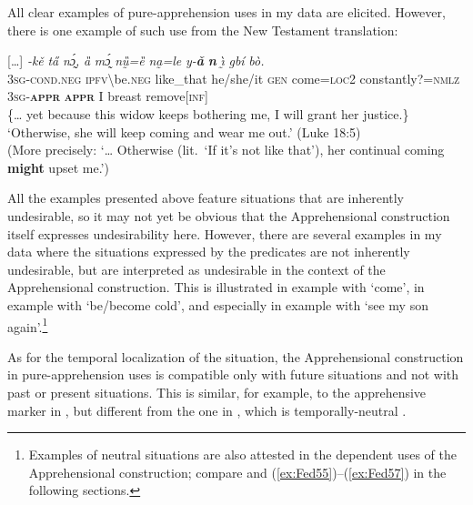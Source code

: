 \documentclass[output=paper,colorlinks,citecolor=brown]{langscibook}
\begin{document}
 All clear examples of pure-apprehension uses in my data are elicited. However, there is one example of such use from the New Testament translation:

\ea \label{ex:Fed15}
\gll \textup{[}{\ldots}\textup{]} \textit{{\E}-kě} \textit{ta̋} \textit{nɔ̰́,} \textit{ȁ} \textit{mɔ̰́} \textit{nṵ̏=ȅ} \textit{n{\ù}a̰=le} \textit{y-\textbf{ǎ}} \textit{\textbf{n{\ù}}} \textit{ı̰̀} \textit{gbí} \textit{bò.} \\
{} \textsc{3sg-cond.neg} \textsc{ipfv}\backslash be.\textsc{neg} like\_that he/she/it \textsc{gen} come=\textsc{loc2} constantly?=\textsc{nmlz} \textsc{3sg-\textbf{appr}} \textsc{\textbf{appr}} I breast remove[\textsc{inf}] \\
\glt \{{\dots} yet because this widow keeps bothering me, I will grant her justice.\} `Otherwise, she will keep coming and wear me out.' (Luke 18:5) \\
(More precisely: `{\dots} Otherwise (lit.\ `If it's not like that'), her continual coming \textbf{might} upset me.')
\z

All the examples presented above feature situations that are inherently undesirable, so it may not yet be obvious that the Apprehensional construction itself expresses undesirability here. However, there are several examples in my data where the situations expressed by the predicates are not inherently undesirable, but are interpreted as undesirable in the context of the Apprehensional construction. This is illustrated in example  with `come', in example  with `be\slash become cold', and especially in example  with `see my son again'.\footnote{Examples of neutral situations are also attested in the dependent uses of the Apprehensional construction; compare  and (\ref{ex:Fed55})--(\ref{ex:Fed57}) in the following sections.}

\z

 As for the temporal localization of the situation, the Apprehensional construction in pure-apprehension uses is compatible only with future situations and not with past  or present  situations. This is similar, for example, to the apprehensive marker in  \citep[265]{vuillermet2018}, but different from the one in , which is temporally-neutral \citep[296]{lichtenberk1995}.
\end{document}
